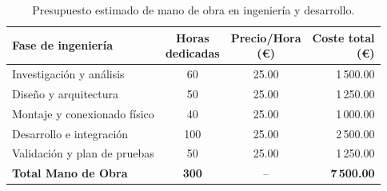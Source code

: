 \begin{table}[H]
    \centering
    \small
    \renewcommand{\arraystretch}{1.2}
    \setlength{\tabcolsep}{5pt}
    \begin{tabular}{|l|c|c|r|}
        \hline
        \rowcolor[gray]{0.9} 
        \parbox[c]{4.6cm}{\vspace{0.3cm}\centering\textbf{Fase de ingeniería}\vspace{0.3cm}} & \parbox[c]{2.0cm}{\centering\vspace{0.3cm}\textbf{Horas\\dedicadas}\vspace{0.3cm}} & \parbox[c]{2.2cm}{\centering\vspace{0.3cm}\textbf{Precio/Hora\\(\euro)}\vspace{0.3cm}} & \parbox[c]{2.2cm}{\centering\vspace{0.3cm}\textbf{Coste total\\(\euro)}\vspace{0.3cm}} \\ \hline
        \parbox[c]{4.6cm}{\vspace{0.1cm}Investigación y análisis\vspace{0.1cm}}    & 60  & 25.00 & 1\,500.00 \\ \hline
        \parbox[c]{4.6cm}{\vspace{0.1cm}Diseño y arquitectura\vspace{0.1cm}}       & 50  & 25.00 & 1\,250.00 \\ \hline
        \parbox[c]{4.6cm}{\vspace{0.1cm}Montaje y conexionado físico\vspace{0.1cm}}& 40  & 25.00 & 1\,000.00 \\ \hline
        \parbox[c]{4.6cm}{\vspace{0.1cm}Desarrollo e integración\vspace{0.1cm}}    & 100 & 25.00 & 2\,500.00 \\ \hline
        \parbox[c]{4.6cm}{\vspace{0.1cm}Validación y plan de pruebas\vspace{0.1cm}}& 50  & 25.00 & 1\,250.00 \\ \hline
        \parbox[c]{4.6cm}{\vspace{0.15cm}\textbf{Total Mano de Obra}\vspace{0.15cm}} & \textbf{300} & --    & \textbf{7\,500.00} \\ \hline
    \end{tabular}
    \caption{Presupuesto estimado de mano de obra en ingeniería y desarrollo.}
    \label{tbl:mano_obra}
\end{table}

